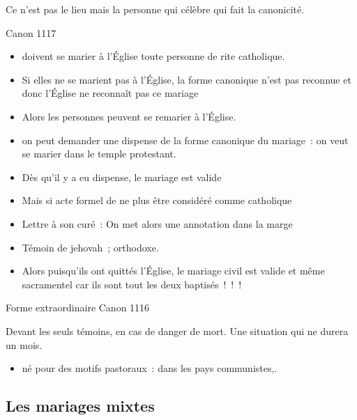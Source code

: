 Ce n'est pas le lieu mais la personne qui célèbre qui fait la
canonicité.

Canon 1117

\begin{itemize}
\item
  doivent se marier à l'Église toute personne de rite catholique.
\item
  Si elles ne se marient pas à l'Église, la forme canonique n'est pas
  reconnue et donc l'Église ne reconnaît pas ce mariage
\item
   
  Alors les personnes peuvent se remarier à l'Église.
   
\item
  on peut demander une dispense de la forme canonique du mariage~: on
  veut se marier dans le temple protestant.
\item
   
  Dès qu'il y a eu dispense, le mariage est valide
   
\item
  Mais si acte formel de ne plus être considéré comme catholique
\item
   
  Lettre à son curé~: On met alors une annotation dans la marge
   
\item
   
  Témoin de jehovah~; orthodoxe.
   
\item
   
  Alors puisqu'ils ont quittés l'Église, le mariage civil est valide et
  même sacramentel car ils sont tout les deux baptisés~!~!~!
   
\end{itemize}

Forme extraordinaire Canon 1116

Devant les seuls témoins, en cas de danger de mort. Une situation qui ne
durera un mois.

\begin{itemize}
\item
  né pour des motifs pastoraux~: dans les pays communistes,.
\end{itemize}

\hypertarget{les-mariages-mixtes}{%
\subsection{Les mariages mixtes}\label{les-mariages-mixtes}}

